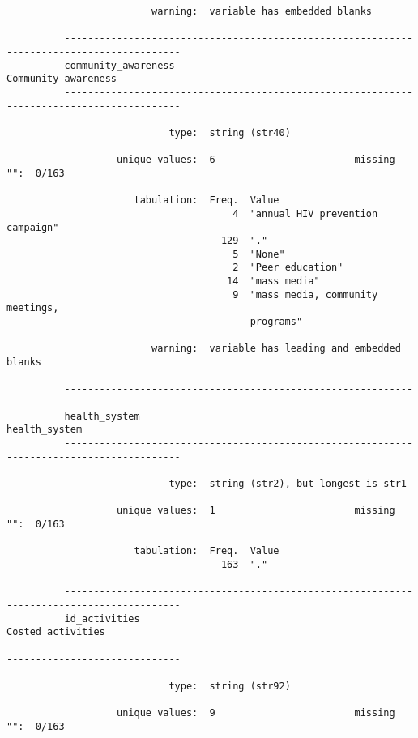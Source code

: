 \documentclass{article}
\begin{document}
\begin{verbatim}
                         warning:  variable has embedded blanks
          
          ------------------------------------------------------------------------------------------
          community_awareness                                                    Community awareness
          ------------------------------------------------------------------------------------------
          
                            type:  string (str40)
          
                   unique values:  6                        missing "":  0/163
          
                      tabulation:  Freq.  Value
                                       4  "annual HIV prevention campaign"
                                     129  "."
                                       5  "None"
                                       2  "Peer education"
                                      14  "mass media"
                                       9  "mass media, community meetings,
                                          programs"
          
                         warning:  variable has leading and embedded blanks
          
          ------------------------------------------------------------------------------------------
          health_system                                                                health_system
          ------------------------------------------------------------------------------------------
          
                            type:  string (str2), but longest is str1
          
                   unique values:  1                        missing "":  0/163
          
                      tabulation:  Freq.  Value
                                     163  "."
          
          ------------------------------------------------------------------------------------------
          id_activities                                                            Costed activities
          ------------------------------------------------------------------------------------------
          
                            type:  string (str92)
          
                   unique values:  9                        missing "":  0/163
          

\end{verbatim}
\end{document}
